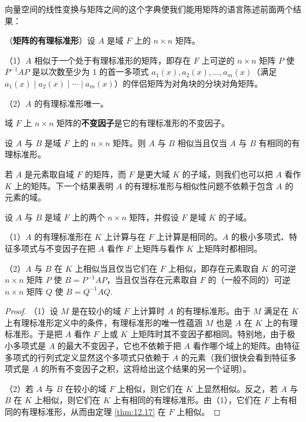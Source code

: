 向量空间的线性变换与矩阵之间的这个字典使我们能用矩阵的语言陈述前面两个结果：

\begin{theorem}\label{thm:12.16}
（\textbf{矩阵的有理标准形}）设 \(A\) 是域 \(F\) 上的 \(n \times n\) 矩阵。

（1）\(A\) 相似于一个处于有理标准形的矩阵，即存在 \(F\) 上可逆的 \(n \times n\) 矩阵 \(P\) 使 \(P^{-1}AP\) 是以次数至少为 1 的首一多项式 \(a_1(x), a_2(x), \ldots, a_m(x)\)（满足 \(a_1(x) \mid a_2(x) \mid \cdots \mid a_m(x)\)）的伴侣矩阵为对角块的分块对角矩阵。

（2）\(A\) 的有理标准形唯一。
\end{theorem}

\begin{definition}
域 \(F\) 上 \(n \times n\) 矩阵的\textbf{不变因子}是它的有理标准形的不变因子。
\end{definition}

\begin{theorem}\label{thm:12.17}
设 \(A\) 与 \(B\) 是域 \(F\) 上的 \(n \times n\) 矩阵。则 \(A\) 与 \(B\) 相似当且仅当 \(A\) 与 \(B\) 有相同的有理标准形。
\end{theorem}

若 \(A\) 是元素取自域 \(F\) 的矩阵，而 \(F\) 是更大域 \(K\) 的子域，则我们也可以把 \(A\) 看作 \(K\) 上的矩阵。下一个结果表明 \(A\) 的有理标准形与相似性问题不依赖于包含 \(A\) 的元素的域。

\begin{corollary}\label{cor:12.18}
设 \(A\) 与 \(B\) 是域 \(F\) 上的两个 \(n \times n\) 矩阵，并假设 \(F\) 是域 \(K\) 的子域。

（1）\(A\) 的有理标准形在 \(K\) 上计算与在 \(F\) 上计算是相同的。\(A\) 的极小多项式、特征多项式与不变因子在把 \(A\) 看作 \(F\) 上矩阵与看作 \(K\) 上矩阵时都相同。

（2）\(A\) 与 \(B\) 在 \(K\) 上相似当且仅当它们在 \(F\) 上相似，即存在元素取自 \(K\) 的可逆 \(n \times n\) 矩阵 \(P\) 使 \(B = P^{-1}AP\)，当且仅当存在元素取自 \(F\) 的（一般不同的）可逆 \(n \times n\) 矩阵 \(Q\) 使 \(B = Q^{-1}AQ\).
\end{corollary}

\begin{proof}
（1）设 \(M\) 是在较小的域 \(F\) 上计算时 \(A\) 的有理标准形。由于 \(M\) 满足在 \(K\) 上有理标准形定义中的条件，有理标准形的唯一性蕴涵 \(M\) 也是 \(A\) 在 \(K\) 上的有理标准形。于是把 \(A\) 看作 \(F\) 上或 \(K\) 上矩阵时其不变因子都相同。特别地，由于极小多项式是 \(A\) 的最大不变因子，它也不依赖于把 \(A\) 看作哪个域上的矩阵。由特征多项式的行列式定义显然这个多项式只依赖于 \(A\) 的元素（我们很快会看到特征多项式是 \(A\) 的所有不变因子之积，这将给出这个结果的另一个证明）。

（2）若 \(A\) 与 \(B\) 在较小的域 \(F\) 上相似，则它们在 \(K\) 上显然相似。反之，若 \(A\) 与 \(B\) 在 \(K\) 上相似，则它们在 \(K\) 上有相同的有理标准形。由（1），它们在 \(F\) 上有相同的有理标准形，从而由定理 \ref{thm:12.17} 在 \(F\) 上相似。
\end{proof}

